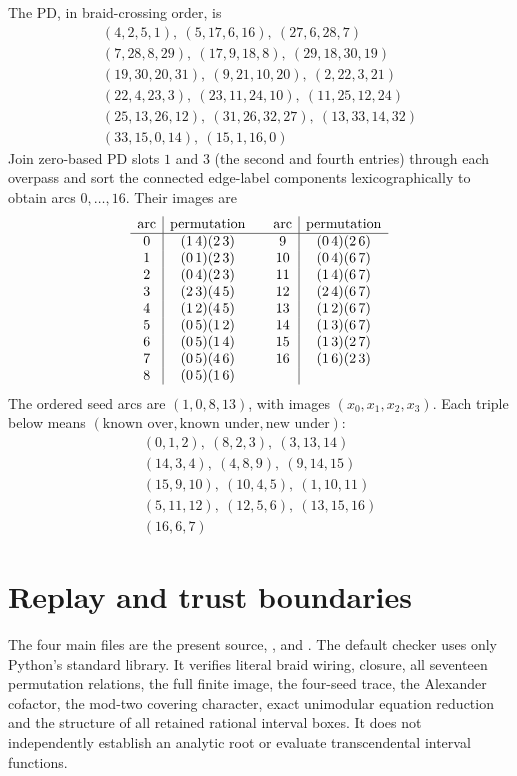 \documentclass[11pt]{article}
\begin{document}
The PD, in braid-crossing order, is
\[
\begin{gathered}
(4,2,5,1),\ (5,17,6,16),\ (27,6,28,7)\\
(7,28,8,29),\ (17,9,18,8),\ (29,18,30,19)\\
(19,30,20,31),\ (9,21,10,20),\ (2,22,3,21)\\
(22,4,23,3),\ (23,11,24,10),\ (11,25,12,24)\\
(25,13,26,12),\ (31,26,32,27),\ (13,33,14,32)\\
(33,15,0,14),\ (15,1,16,0)
\end{gathered}
\]
Join zero-based PD slots $1$ and $3$ (the second and fourth entries)
through each overpass and sort the
connected edge-label components lexicographically to obtain arcs
$0,\ldots,16$. Their images are
\[
\begin{array}{c|c@{\qquad}c|c}
\text{arc}&\text{permutation}&\text{arc}&\text{permutation}\\\hline
0 & (1\,4)(2\,3) & 9 & (0\,4)(2\,6)\\
1 & (0\,1)(2\,3) & 10 & (0\,4)(6\,7)\\
2 & (0\,4)(2\,3) & 11 & (1\,4)(6\,7)\\
3 & (2\,3)(4\,5) & 12 & (2\,4)(6\,7)\\
4 & (1\,2)(4\,5) & 13 & (1\,2)(6\,7)\\
5 & (0\,5)(1\,2) & 14 & (1\,3)(6\,7)\\
6 & (0\,5)(1\,4) & 15 & (1\,3)(2\,7)\\
7 & (0\,5)(4\,6) & 16 & (1\,6)(2\,3)\\
8 & (0\,5)(1\,6) & &\\
\end{array}
\]
The ordered seed arcs are $(1,0,8,13)$, with images
$(x_0,x_1,x_2,x_3)$. Each triple below means
$(\text{known over},\text{known under},\text{new under})$:
\[
\begin{gathered}
(0,1,2),\ (8,2,3),\ (3,13,14)\\
(14,3,4),\ (4,8,9),\ (9,14,15)\\
(15,9,10),\ (10,4,5),\ (1,10,11)\\
(5,11,12),\ (12,5,6),\ (13,15,16)\\
(16,6,7)
\end{gathered}
\]

\section{Replay and trust boundaries}

The four main files are the present source,
,
 and
.
The default checker uses only Python's standard library. It verifies
literal braid wiring, closure, all seventeen permutation relations,
the full finite image, the four-seed trace, the Alexander cofactor,
the mod-two covering character, exact unimodular equation reduction
and the structure of all retained rational interval boxes.
It does not independently establish an analytic root or evaluate
transcendental interval functions.
\end{document}
